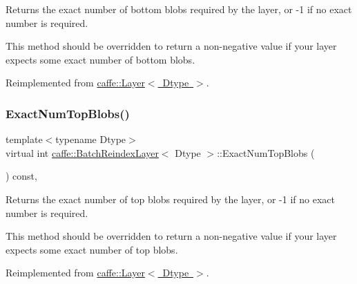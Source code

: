 Returns the exact number of bottom blobs required by the layer, or -\/1 if no exact number is required. 

This method should be overridden to return a non-\/negative value if your layer expects some exact number of bottom blobs. 

Reimplemented from \mbox{\hyperlink{classcaffe_1_1_layer_a8e5ee0494d85f5f55fc4396537cbc60f}{caffe\+::\+Layer$<$ Dtype $>$}}.

\mbox{\label{classcaffe_1_1_batch_reindex_layer_a7d5c537334359c2a83cce489fb534342}} 
\subsubsection{\texorpdfstring{Exact\+Num\+Top\+Blobs()}{ExactNumTopBlobs()}\hspace{0.1cm}{\footnotesize\ttfamily [1/2]}}
{\footnotesize\ttfamily template$<$typename Dtype$>$ \\
virtual int \mbox{\hyperlink{classcaffe_1_1_batch_reindex_layer}{caffe\+::\+Batch\+Reindex\+Layer}}$<$ Dtype $>$\+::Exact\+Num\+Top\+Blobs (\begin{DoxyParamCaption}{ }\end{DoxyParamCaption}) const\hspace{0.3cm}{\ttfamily [inline]}, {\ttfamily [virtual]}}



Returns the exact number of top blobs required by the layer, or -\/1 if no exact number is required. 

This method should be overridden to return a non-\/negative value if your layer expects some exact number of top blobs. 

Reimplemented from \mbox{\hyperlink{classcaffe_1_1_layer_a64e2ca72c719e4b2f1f9216ccfb0d37f}{caffe\+::\+Layer$<$ Dtype $>$}}.

\mbox{\label{classcaffe_1_1_batch_reindex_layer_a7d5c537334359c2a83cce489fb534342}} 
